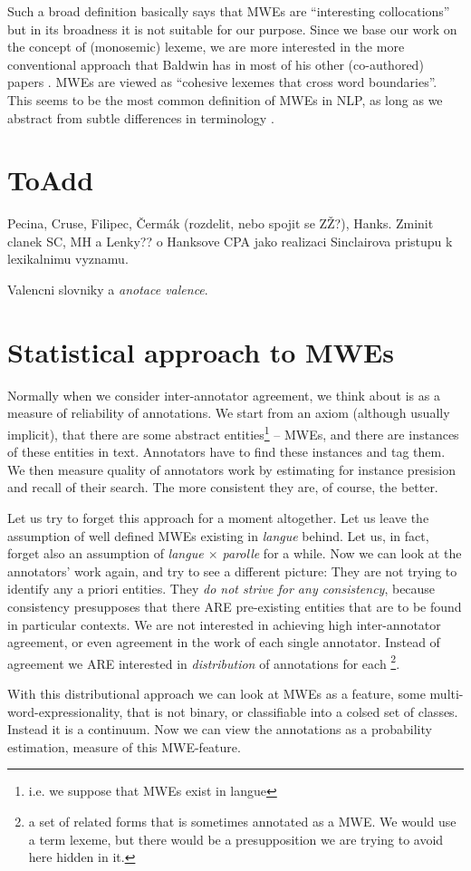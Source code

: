 Such a broad definition basically says that MWEs are ``interesting collocations'' but in its broadness it is not suitable for our purpose. Since we base our work on the concept of (monosemic) lexeme, we are more interested in the more conventional approach that Baldwin has in most of his other (co-authored) papers \citep{baldwin:2003,sag:2002}. MWEs are viewed as ``cohesive lexemes that cross word boundaries''. This seems to be the most common definition of MWEs in NLP, as long as we abstract from subtle differences in terminology \citep{calzolari, copestake, dalsi?}. 


\section{ToAdd}
Pecina, Cruse, Filipec, Čermák (rozdelit, nebo spojit se ZŽ?), Hanks. Zminit clanek SC, MH a Lenky?? o Hanksove CPA jako realizaci Sinclairova pristupu k lexikalnimu vyznamu.

Valencni slovniky a \emph{anotace valence}.

\section{Statistical approach to MWEs}
Normally when we consider inter-annotator agreement, we think about is as a measure of reliability of annotations. We start from an axiom (although usually implicit), that there are some abstract entities\footnote{i.e. we suppose that MWEs exist in langue} -- MWEs, and there are instances of these entities in text. Annotators have to find these instances and tag them. We then measure quality of annotators work by estimating for instance presision and recall of their search. The more consistent they are, of course, the better.

Let us try to forget this approach for a moment altogether. Let us leave the assumption of well defined MWEs existing in \emph{langue} behind. Let us, in fact, forget also an assumption of \emph{langue $\times$ parolle} for a while. Now we can look at the annotators' work again, and try to see a different picture: They are not trying to identify any a priori entities. They \emph{do not strive for any consistency}, because consistency presupposes that there ARE pre-existing entities that are to be found in particular contexts. We are not interested in achieving high inter-annotator agreement, or even agreement in the work of each single annotator. Instead of agreement we ARE interested in \emph{distribution} of annotations for each \footnote{a set of related forms that is sometimes annotated as a MWE. We would use a term lexeme, but there would be a presupposition we are trying to avoid here hidden in it.}. 

With this distributional approach we can look at MWEs as a feature, some multi-word-expressionality, that is not binary, or classifiable into a colsed set of classes. Instead it is a continuum. Now we can view the annotations as a probability estimation, measure of this MWE-feature.
